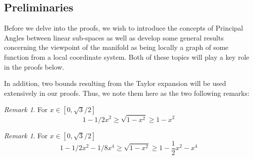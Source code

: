 \documentclass[12pt]{article}
\theoremstyle{remark}
\newtheorem{remark}[Theorem]{Remark}
\begin{document}
\begin{appendices}


\section{Preliminaries}
Before we delve into the proofs, we wish to introduce the concepts of Principal Angles between linear sub-spaces \cite{jordan1875essai,bjorck1973numerical} as well as develop some general results concerning the viewpoint of the manifold as being locally a graph of some function from a local coordinate system.
Both of these topics will play a key role in the proofs below.

In addition, two bounds resulting from the Taylor expansion will be used extensively in our proofs.
Thus, we note them here as the two following remarks:

\begin{remark}\label{rem:taylor_sqrt1-x2_clean}
For $x\in[0,\sqrt{3}/2]$
\begin{equation}\label{eq:Taylor2ndOrder}
    1-1/2x^2 \geq \sqrt{1 - x^2} \geq 1-x^2
\end{equation}
\end{remark}
\begin{remark}\label{rem:taylor2_sqrt1-x2_clean}
For $x\in[0,\sqrt{3}/2]$
\begin{equation}
1-1/2x^2-1/8x^4 \geq \sqrt{1 - x^2} \geq 1-\frac{1}{2}x^2 - x^4    
\end{equation}
\end{remark}



\end{appendices}
\end{document}
